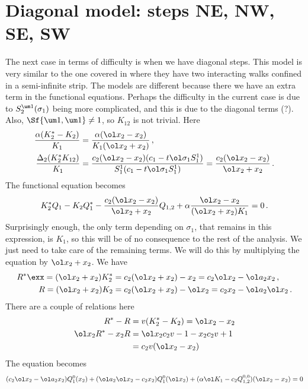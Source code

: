 \section{Diagonal model: steps NE, NW, SE, SW}
The next case in terms of difficulty is when we have diagonal steps. This model is very similar to the one covered in \cite{wong2014confining} where they have two interacting walks confined in a semi-infinite strip. The models are different because there we have an extra term in the functional equations. Perhaps the difficulty in the current case is due to $S_2^{\um 1}(\sigma_1)$ being more complicated, and this is due to the diagonal terms (?). Also, $\Sf{\um 1, \um 1} \neq 1$, so $K_{12}$ is not trivial. Here
\begin{align}
	\frac{\alpha(K_2^\ast -K_2)}{K_1}  &= \frac{\alpha (\ol x_2 - x_2)}{K_1(\ol x_2+x_2)}\,,\\
	\frac{\Delta_2(K_2^\ast K_{12})}{K_1} &= \frac{c_2(\ol x_2-x_2)(c_1- t \ol \sigma_1S_1^1)}{S_1^1(c_1-t\ol \sigma_1S_1^1)} = \frac{c_2(\ol x_2-x_2)}{\ol x_2+x_2}\,.
\end{align}
The functional equation becomes
\begin{align}
   K_2^\ast Q_1 - K_2 Q_1^\ast -\frac{c_2(\ol x_2-x_2)}{\ol x_2+x_2}Q_{1,2}+\alpha\frac{\ol x_2-x_2}{(\ol x_2+x_2)K_1}= 0\,.
\end{align}
Surprisingly enough, the only term depending on $\sigma_1$, that remains in this expression, is $K_1$, so this will be of no consequence to the rest of the analysis. We just need to take care of the remaining terms. We will do this by multiplying the equation by $\ol x_2+x_2$. We have
\begin{align}
	R^\ast \exx= (\ol x_2+x_2) K_2^\ast &= c_2(\ol x_2+x_2)-x_2 = c_2\ol x_2- \ol a_2x_2\,,\\
	R = (\ol x_2+x_2) K_2 &= c_2(\ol x_2+x_2)-\ol x_2 = c_2x_2- \ol a_2\ol x_2\,.
\end{align}
There are a couple of relations here
\begin{align}
	R^\ast - R &= v(K_2^\ast-K_2) = \ol x_2-x_2\\
	\ol x_2R^\ast - x_2 R &= \ol x_2c_2v-1- x_2 c_2v+1 \\
				      & = c_2v(\ol x_2-x_2)
\end{align}
The equation becomes
\begin{align}
(c_2\ol x_2- \ol a_2x_2)Q_1^0(x_2)+ ( \ol a_2\ol x_2-c_2x_2) Q_1^0(\ol x_2)+(\alpha \ol K_1 - c_2Q_{1,2}^{0,0})(\ol x_2-x_2)= 0
\end{align}
